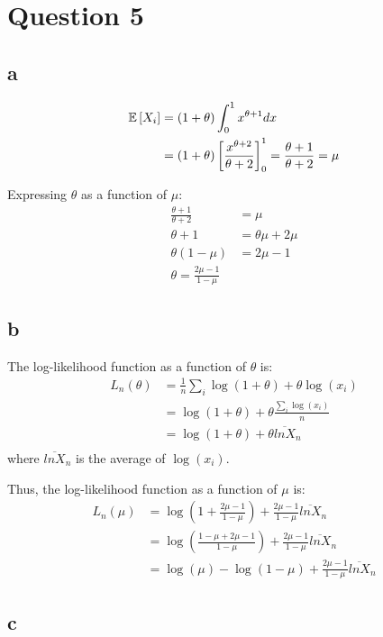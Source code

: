 \documentclass[12pt]{paper}
\begin{document}
\section*{Question 5}

\subsection*{a}
\begin{align*}
\mathbb{E} \left [ X_i \right ]&=(1+\theta)\int_0^1{x^{\theta+1}dx}\\
&=(1+\theta)\left[\frac{x^{\theta+2}}{\theta+2}\right]^1_0=\frac{\theta+1}{\theta+2}=\mu
\end{align*}

Expressing $\theta$ as a function of $\mu$:
\begin{align*}
\frac{\theta+1}{\theta+2}&=\mu\\
\theta+1&=\theta\mu+2\mu\\
\theta(1-\mu)&=2\mu-1\\
\theta=\frac{2\mu-1}{1-\mu}
\end{align*}

\subsection*{b}

The log-likelihood function as a function of $\theta$ is:
\begin{align*}
L_n(\theta)&=\frac{1}{n}\sum_i{\log{(1+\theta)}+\theta\log{(x_i)}}\\
&=\log{(1+\theta)}+\theta\frac{\sum_i{\log{(x_i)}}}{n}\\
&=\log{(1+\theta)}+\theta\overline{lnX}_n\\
\end{align*}
\noindent where $\overline{lnX}_n$ is the average of $\log(x_i)$.

Thus, the  log-likelihood function as a function of $\mu$ is:
\begin{align*}
L_n(\mu)&=\log{(1+\frac{2\mu-1}{1-\mu})}+\frac{2\mu-1}{1-\mu}\overline{lnX}_n\\
&=\log(\frac{1-\mu+2\mu-1}{1-\mu})+\frac{2\mu-1}{1-\mu}\overline{lnX}_n\\
&=\log(\mu)-\log(1-\mu)+\frac{2\mu-1}{1-\mu}\overline{lnX}_n
\end{align*}

\subsection*{c}
\end{document}
